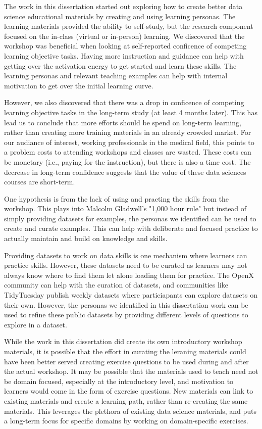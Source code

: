 \documentclass[../main.tex]{subfiles}
\begin{document}
The work in this dissertation started out exploring how to create better data science educational materials
by creating and using learning personas.
The learning materials provided the ability to self-study,
but the research component focused on the in-class (virtual or in-person) learning.
We discovered that the workshop was beneficial when looking at self-reported conficence of competing learning objective tasks.
Having more instruction and guidance can help with getting over the activation energy to get started and learn these skills.
The learning personas and relevant teaching examples can help with internal motivation
to get over the initial learning curve.

However, we also discovered that there was a drop in conficence of competing learning objective tasks
in the long-term study (at least 4 months later).
This has lead us to conclude that more efforts should be spend on long-term learning,
rather than creating more training materials in an already crowded market.
For our audiance of interest, working professionals in the medical field,
this points to a problem costs to attending workshops and classes are wasted.
These costs can be monetary (i.e., paying for the instruction), but there is also a time cost.
The decrease in long-term confidence suggests that the value of these data sciences courses are short-term.

One hypothesis is from the lack of using and practing the skills from the workshop.
This plays into Malcolm Gladwell's "1,000 hour rule" but instead of simply providing datasets for examples,
the personas we identified can be used to create and curate examples.
This can help with deliberate and focused practice to actually maintain and build on knowledge and skills.

Providing datasets to work on data skills is one mechanism where learners can practice skills.
However, these datasets need to be curated as learners may not always know where to find them let alone loading them for practice.
The OpenX community can help with the curation of datasets,
and communities like TidyTuesday publish weekly datasets where particiapants can explore datasets on their own.
However, the personas we identified in this dissertation work can be used to refine these public datasets
by providing different levels of questions to explore in a dataset.

While the work in this dissertation did create its own introductory workshop materials,
it is possible that the effort in curating the leraning materials could have been better served creating exercise questions
to be used during and after the actual workshop.
It may be possible that the materials used to teach need not be domain focused,
especially at the introductory level,
and motivation to learners would come in the form of exercise questions.
New materials can link to existing materials and create a learning path,
rather than re-creating the same materials.
This leverages the plethora of existing data science materials,
and puts a long-term focus for specific domains by working on domain-specific exercises.
\end{document}
